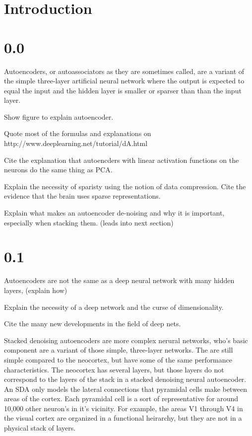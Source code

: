 \documentclass[11pt]{article}
\begin{document}
         
\section{Introduction}
\label{Introduction}

\section{0.0}
\label{Background on de-noising autoencoders}
Autoencoders, or autoassociators as they are sometimes called, are a variant of the simple three-layer artificial neural network where the output is expected to equal the input and the hidden layer is smaller or sparser than than the input layer.

Show figure to explain autoencoder.

Quote most of the formulas and explanations on http://www.deeplearning.net/tutorial/dA.html

Cite the explanation that autoencders with linear activation functions on the neurons do the same thing as PCA.

Explain the necessity of sparisty using the notion of data compression. Cite the evidence that the brain uses sparse representations. 

Explain what makes an autoencoder de-noising and why it is important, especially when stacking them. (leads into next section)


\section{0.1}
\label{Stacked de-noising autoencoders}
Autoencoders are not the same as a deep neural network with many hidden layers, (explain how)

Explain the necessity of a deep network and the curse of dimensionality.

Cite the many new developments in the field of deep nets.

Stacked denoising autoencoders are more complex nerural networks, who's basic component are a variant of those simple, three-layer networks. The are still simple compared to the neocortex, but have some of the same performance characteristics. The neocortex has several layers, but those layers do not correspond to the layers of the stack in a stacked denoising neural autoencoder. An SDA only models the lateral connections that pyramidal cells make between areas of the cortex. Each pyramidal cell is a sort of representative for around 10,000 other neuron's in it's vicinity.  For example, the areas V1 through V4 in the visual cortex are organized in a functional heirarchy, but they are not in a physical stack of layers.
\end{document}
